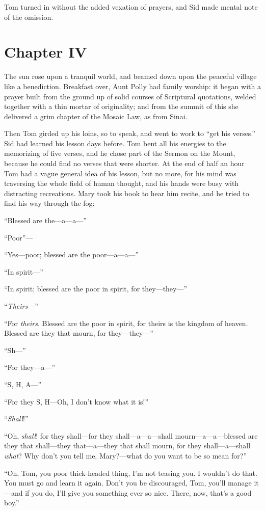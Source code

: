 \documentclass{book}
\begin{document}
Tom turned in without the added vexation of prayers, and Sid made mental note of the omission.

\chapter*{Chapter IV}

The sun rose upon a tranquil world, and beamed down upon the peaceful village like a benediction. Breakfast over, Aunt Polly had family worship: it began with a prayer built from the ground up of solid courses of Scriptural quotations, welded together with a thin mortar of originality; and from the summit of this she delivered a grim chapter of the Mosaic Law, as from Sinai.

Then Tom girded up his loins, so to speak, and went to work to “get his verses.” Sid had learned his lesson days before. Tom bent all his energies to the memorizing of five verses, and he chose part of the Sermon on the Mount, because he could find no verses that were shorter. At the end of half an hour Tom had a vague general idea of his lesson, but no more, for his mind was traversing the whole field of human thought, and his hands were busy with distracting recreations. Mary took his book to hear him recite, and he tried to find his way through the fog:

“Blessed are the—a—a—”

“Poor”—

“Yes—poor; blessed are the poor—a—a—”

“In spirit—”

“In spirit; blessed are the poor in spirit, for they—they—”

“\emph{Theirs}—”

“For \emph{theirs}. Blessed are the poor in spirit, for theirs is the kingdom of heaven. Blessed are they that mourn, for they—they—”

“Sh—”

“For they—a—”

“S, H, A—”

“For they S, H—Oh, I don’t know what it is!”

“\emph{Shall}!”

“Oh, \emph{shall}! for they shall—for they shall—a—a—shall mourn—a—a—blessed are they that shall—they that—a—they that shall mourn, for they shall—a—shall \emph{what}? Why don’t you tell me, Mary?—what do you want to be so mean for?”

“Oh, Tom, you poor thick-headed thing, I’m not teasing you. I wouldn’t do that. You must go and learn it again. Don’t you be discouraged, Tom, you’ll manage it—and if you do, I’ll give you something ever so nice. There, now, that’s a good boy.”
\end{document}
